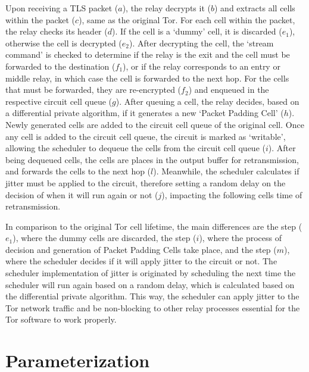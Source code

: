 Upon receiving a TLS packet (\(a\)), the relay decrypts it (\(b\)) and extracts all cells within the packet (\(c\)), same as the original Tor. For each cell within the packet, the relay checks its header (\(d\)). If the cell is a `dummy' cell, it is discarded (\(e_1\)), otherwise the cell is decrypted (\(e_2\)). After decrypting the cell, the `stream command' is checked to determine if the relay is the exit and the cell must be forwarded to the destination (\(f_1\)), or if the relay corresponds to an entry or middle relay, in which case the cell is forwarded to the next hop. For the cells that must be forwarded, they are re-encrypted (\(f_2\)) and enqueued in the respective circuit cell queue (\(g\)). After queuing a cell, the relay decides, based on a differential private algorithm, if it generates a new `Packet Padding Cell' (\(h\)). Newly generated cells are added to the circuit cell queue of the original cell. Once any cell is added to the circuit cell queue, the circuit is marked as `writable', allowing the scheduler to dequeue the cells from the circuit cell queue (\(i\)). After being dequeued cells, the cells are places in the output buffer for retransmission, and forwards the cells to the next hop (\(l\)). Meanwhile, the scheduler calculates if jitter must be applied to the circuit, therefore setting a random delay on the decision of when it will run again or not (\(j\)), impacting the following cells time of retransmission. 

In comparison to the original Tor cell lifetime, the main differences are the step (\(e_1\)), where the dummy cells are discarded, the step (\(i\)), where the process of decision and generation of  Packet Padding Cells take place, and the step (\(m\)), where the scheduler decides if it will apply jitter to the circuit or not. The scheduler implementation of jitter is originated by scheduling the next time the scheduler will run again based on a random delay, which is calculated based on the differential private algorithm. This way, the scheduler can apply jitter to the Tor network traffic and be non-blocking to other relay processes essential for the Tor software to work properly. 

\section{Parameterization}\label{sec:parameterization}


